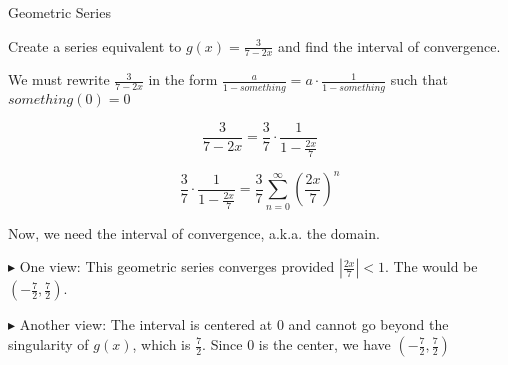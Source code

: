 \documentclass{ximera}
\begin{document}
\begin{example} Geometric Series



Create a series equivalent to $g(x)=\frac{3}{7 - 2x}$ and find the interval of convergence.



\begin{explanation}


We must rewrite $\frac{3}{7 - 2x}$ in the form $\frac{a}{1-something} = a \cdot \frac{1}{1-something}$ such that $something(0) = 0$




\[     \frac{3}{7 - 2x}  =   \frac{3}{7} \cdot \frac{1}{1 - \frac{2x}{7}}   \]



\[  \frac{3}{7} \cdot \frac{1}{1 - \frac{2x}{7}} =  \frac{3}{7} \sum\limits_{n=0}^{\infty} \left(\frac{2x}{7}\right)^n       \]





Now, we need the interval of convergence, a.k.a. the domain.  


$\blacktriangleright$ One view:  This geometric series converges provided   $\left| \frac{2x}{7} \right| < 1$.  The would be $\left(-\frac{7}{2}, \frac{7}{2} \right)$.



$\blacktriangleright$ Another view: The interval is centered at $0$ and cannot go beyond the singularity of $g(x)$, which is $\frac{7}{2}$.  Since $0$ is the center, we have $\left(-\frac{7}{2}, \frac{7}{2} \right)$


\end{explanation}





\end{example}
\end{document}
